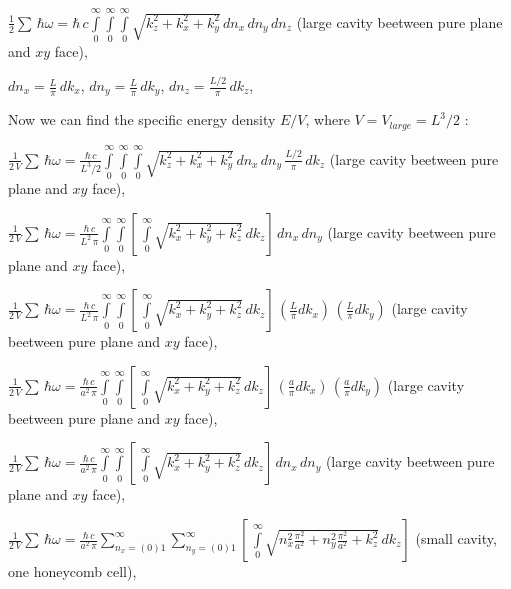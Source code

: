 \documentclass[11pt]{article}
\begin{document}
    \(\frac{1}{2}\sum\,\hbar\omega = \hbar\,c\int\limits_{0}^{\infty}\int\limits_{0}^{\infty}\int\limits_{0}^{\infty}\sqrt{k_z^2+k_x^2+k_y^2}\,d{n_x}\,d{n_y}\,d{n_z}\)
(large cavity beetween pure plane and \(xy\) face),

    \(dn_x = \frac{L}{\pi}\,dk_x\), \(dn_y = \frac{L}{\pi}\,dk_y\),
\(dn_z = \frac{L/2}{\pi}\,dk_z\),

    Now we can find the specific energy density \(E/V\), where
\(V = V_{large} = L^3/2\) :

    \(\frac{1}{2\,V}\sum\,\hbar\omega = \frac{\hbar\,c}{L^3/2}\int\limits_{0}^{\infty}\int\limits_{0}^{\infty}\int\limits_{0}^{\infty}\sqrt{k_z^2+k_x^2+k_y^2}\,dn_x\,dn_y\,\frac{L/2}{\pi}\,dk_z\)
(large cavity beetween pure plane and \(xy\) face),


    \(\frac{1}{2\,V}\sum\,\hbar\omega = \frac{\hbar\,c}{L^2\,\pi}\int\limits_{0}^{\infty}\int\limits_{0}^{\infty}\left[\,\int\limits_{0}^{\infty}\sqrt{k_x^2+k_y^2+k_z^2}\,dk_z\right]\,dn_x\,dn_y\)
(large cavity beetween pure plane and \(xy\) face),

    \(\frac{1}{2\,V}\sum\,\hbar\omega = \frac{\hbar\,c}{L^2\,\pi}\int\limits_{0}^{\infty}\int\limits_{0}^{\infty}\left[\,\int\limits_{0}^{\infty}\sqrt{k_x^2+k_y^2+k_z^2}\,dk_z\right]\,\left(\frac{L}{\pi}dk_x\right)\,\left(\frac{L}{\pi}dk_y\right)\)
(large cavity beetween pure plane and \(xy\) face),

    \(\frac{1}{2\,V}\sum\,\hbar\omega = \frac{\hbar\,c}{a^2\,\pi}\int\limits_{0}^{\infty}\int\limits_{0}^{\infty}\left[\,\int\limits_{0}^{\infty}\sqrt{k_x^2+k_y^2+k_z^2}\,dk_z\right]\,\left(\frac{a}{\pi}dk_x\right)\,\left(\frac{a}{\pi}dk_y\right)\)
(large cavity beetween pure plane and \(xy\) face),

    \(\frac{1}{2\,V}\sum\,\hbar\omega = \frac{\hbar\,c}{a^2\,\pi}\int\limits_{0}^{\infty}\int\limits_{0}^{\infty}\left[\,\int\limits_{0}^{\infty}\sqrt{k_x^2+k_y^2+k_z^2}\,dk_z\right]\,dn_x\,dn_y\)
(large cavity beetween pure plane and \(xy\) face),

    \(\frac{1}{2\,V}\sum\,\hbar\omega = \frac{\hbar\,c}{a^2\,\pi}\sum\limits_{n_x=(0)1}^{\infty}\sum\limits_{n_y=(0)1}^{\infty}\left[\,\int\limits_{0}^{\infty}\sqrt{n_x^2\frac{\pi^2}{a^2}+n_y^2\frac{\pi^2}{a^2}+k_z^2}\,dk_z\right]\)
(small cavity, one honeycomb cell),
\end{document}
